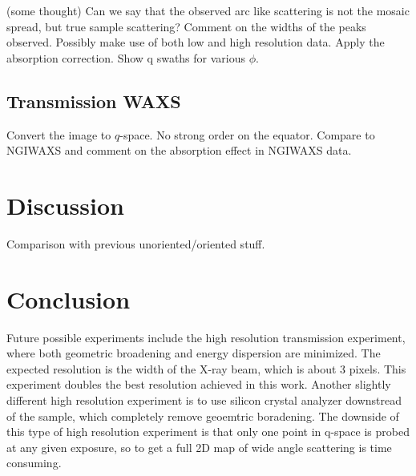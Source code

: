 (some thought) Can we say that
the observed arc like scattering is not the mosaic spread, but
true sample scattering? Comment on the widths of the peaks observed.
Possibly make use of both low and high resolution data.
Apply the absorption correction. Show q swaths for various $\phi$.

\subsection{Transmission WAXS}\label{sec:TWAXS_results}
Convert the image to $q$-space.
No strong order on the equator. 
Compare to NGIWAXS and comment on the absorption effect
in NGIWAXS data.

\section{Discussion}
Comparison with previous unoriented/oriented stuff.

\section{Conclusion}
Future possible experiments
include the high resolution transmission experiment, where both geometric 
broadening and energy dispersion are minimized. The expected resolution 
is the width of the X-ray beam, which is about 3 pixels. This experiment 
doubles the best resolution achieved in this work. 
Another slightly different high resolution experiment is to use silicon 
crystal analyzer downstread of the sample, which completely remove geoemtric
boradening. The downside of this type of high resolution experiment is that
only one point in q-space is probed at any given exposure, so to get a full
2D map of wide angle scattering is time consuming.  
